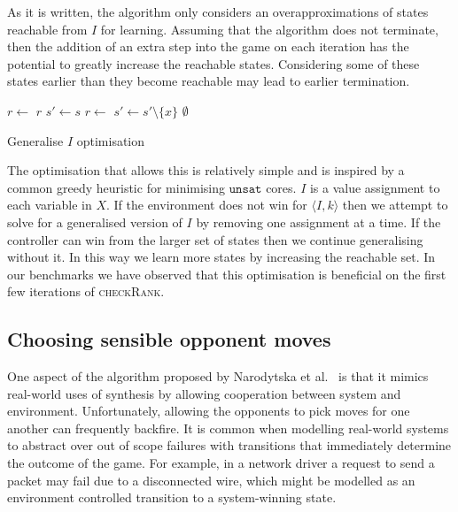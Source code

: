 \documentclass{llncs}
\begin{document}
As it is written, the algorithm only considers an overapproximations of states
reachable from $I$ for learning. Assuming that the algorithm does not
terminate, then the addition of an extra step into the game on each iteration
has the potential to greatly increase the reachable states. Considering some of
these states earlier than they become reachable may lead to earlier
termination.


\begin{algorithm}
    \begin{algorithmic}
            \State $r \gets $ 
             \Return $r$ \EndIIf
            \State $s' \gets s$
                \State $r \gets$ 
                 $s' \gets s' \setminus \{x\}$ \EndIIf
            \EndFor
            \State \Return $\emptyset$
        \EndFunction
    \end{algorithmic}
    \caption{Generalise $I$ optimisation}
    \label{alg:opt1}
\end{algorithm}

The optimisation that allows this is relatively simple and is inspired by a
common greedy heuristic for minimising $\texttt{unsat}$ cores. $I$ is a value
assignment to each variable in $X$. If the environment does not win for
$\langle I, k \rangle$ then we attempt to solve for a generalised version of
$I$ by removing one assignment at a time. If the controller can win from the
larger set of states then we continue generalising without it. In this way we
learn more states by increasing the reachable set. In our benchmarks we have
observed that this optimisation is beneficial on the first few iterations of
\textsc{checkRank}.

\subsection{Choosing sensible opponent moves}

One aspect of the algorithm proposed by Narodytska et al.~\cite{narodytska2014}
is that it mimics real-world uses of synthesis by allowing cooperation between
system and environment. Unfortunately, allowing the opponents to pick moves for
one another can frequently backfire. It is common when modelling real-world
systems to abstract over out of scope failures with transitions that
immediately determine the outcome of the game. For example, in a network driver
a request to send a packet may fail due to a disconnected wire, which might be
modelled as an environment controlled transition to a system-winning state.
\end{document}
